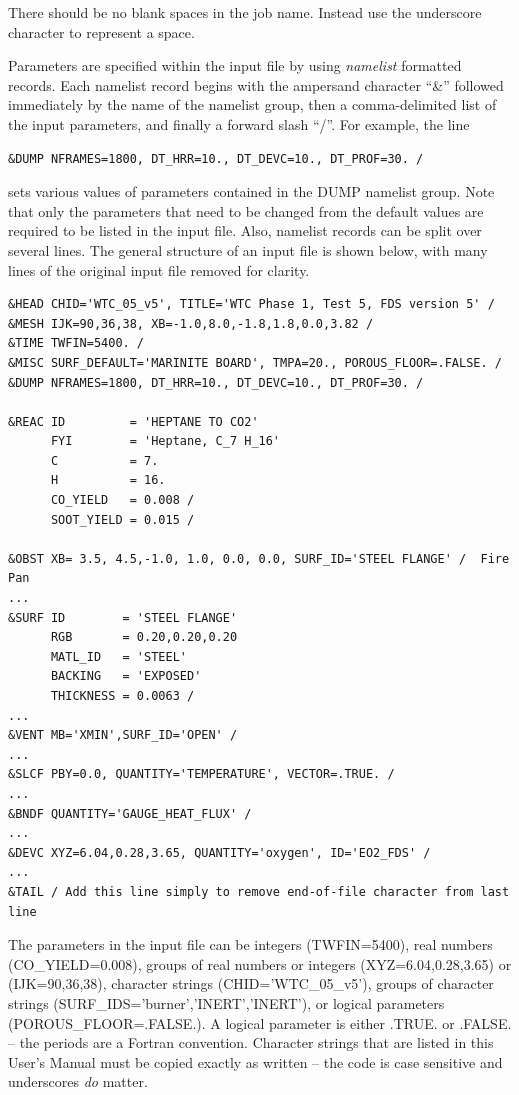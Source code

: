 \documentclass[11pt]{book}
\begin{document}
\begin{warning}
\noindent
There should be no blank spaces in the job name. Instead use the underscore
character to represent a space.
\end{warning}

\noindent
Parameters are specified within the input file by using {\em namelist} formatted records.
Each namelist record begins with the ampersand character ``{\ct \&}'' followed
immediately by the name of the namelist group, then a comma-delimited list of the input parameters, and
finally a forward slash ``{\ct /}''. For example, the line

\footnotesize
\begin{verbatim}
&DUMP NFRAMES=1800, DT_HRR=10., DT_DEVC=10., DT_PROF=30. /
\end{verbatim}

\normalsize \noindent
sets various values of parameters contained in the {\ct DUMP} namelist group.
Note that only the parameters that need to be changed from the default values
are required to be listed in the input file. Also, namelist records can be split over several lines.
The general structure of an input file is shown below, with many
lines of the original input file removed for clarity.

\footnotesize
\begin{verbatim}
&HEAD CHID='WTC_05_v5', TITLE='WTC Phase 1, Test 5, FDS version 5' /
&MESH IJK=90,36,38, XB=-1.0,8.0,-1.8,1.8,0.0,3.82 /
&TIME TWFIN=5400. /
&MISC SURF_DEFAULT='MARINITE BOARD', TMPA=20., POROUS_FLOOR=.FALSE. /
&DUMP NFRAMES=1800, DT_HRR=10., DT_DEVC=10., DT_PROF=30. /

&REAC ID         = 'HEPTANE TO CO2'
      FYI        = 'Heptane, C_7 H_16'
      C          = 7.
      H          = 16.
      CO_YIELD   = 0.008 /
      SOOT_YIELD = 0.015 /

&OBST XB= 3.5, 4.5,-1.0, 1.0, 0.0, 0.0, SURF_ID='STEEL FLANGE' /  Fire Pan
...
&SURF ID        = 'STEEL FLANGE'
      RGB       = 0.20,0.20,0.20
      MATL_ID   = 'STEEL'
      BACKING   = 'EXPOSED'
      THICKNESS = 0.0063 /
...
&VENT MB='XMIN',SURF_ID='OPEN' /
...
&SLCF PBY=0.0, QUANTITY='TEMPERATURE', VECTOR=.TRUE. /
...
&BNDF QUANTITY='GAUGE_HEAT_FLUX' /
...
&DEVC XYZ=6.04,0.28,3.65, QUANTITY='oxygen', ID='EO2_FDS' /
...
&TAIL / Add this line simply to remove end-of-file character from last line
\end{verbatim}
\normalsize

\noindent
The parameters in the input file can be integers ({\ct TWFIN=5400}),
real numbers ({\ct CO\_YIELD=0.008}), groups of real numbers or integers
({\ct XYZ=6.04,0.28,3.65}) or ({\ct IJK=90,36,38}),
character strings ({\ct CHID='WTC\_05\_v5'}), groups of character strings
({\ct SURF\_IDS='burner','INERT','INERT'}),
or logical parameters ({\ct POROUS\_FLOOR=.FALSE.}). A logical parameter is either
{\ct .TRUE.} or {\ct .FALSE.} -- the periods are a
Fortran convention. Character strings that are listed in
this User's Manual must be copied exactly as written -- the code
is case sensitive and underscores {\em do} matter.
\end{document}
